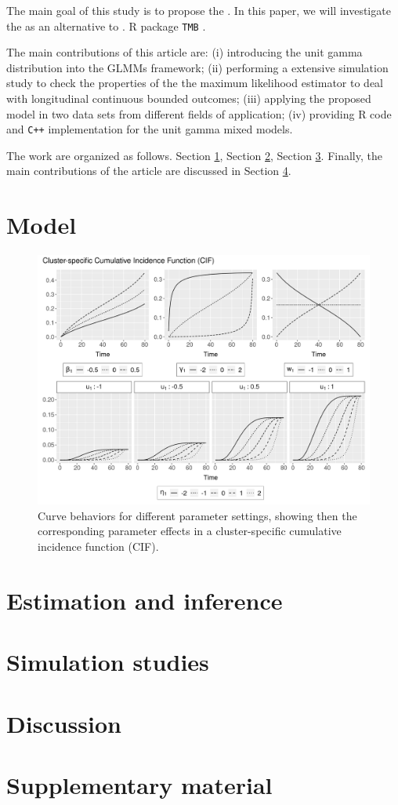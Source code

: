 \documentclass[a4paper,12pt]{article}
\begin{document}
The main goal of this study is to propose the . In this paper, we will
investigate the as an alternative to . R \citep{R21} package
\texttt{TMB} \citep{TMb}.

The main contributions of this article are: (i) introducing the unit
gamma distribution into the GLMMs framework; (ii) performing a extensive
simulation study to check the properties of the the maximum likelihood
estimator to deal with longitudinal continuous bounded outcomes; (iii)
applying the proposed model in two data sets from different fields of
application; (iv) providing R code and \texttt{C++} implementation for
the unit gamma mixed models.

The work are organized as follows. Section \ref{model}, Section
\ref{inference}, Section \ref{simulation}. Finally, the main
contributions of the article are discussed in Section \ref{discussion}.

\section{Model}
\label{model}

\begin{figure}[H]
 \centering \includegraphics[width=\linewidth]{pics/cifstudy-1.png}
 \vspace{-0.75cm}
 \caption{Curve behaviors for different parameter settings, showing then
   the corresponding parameter effects in a cluster-specific cumulative
   incidence function (CIF).}
 \label{fig:cifcoefs}
\end{figure}

\section{Estimation and inference}
\label{inference}

\section{Simulation studies}
\label{simulation}

\section{Discussion}
\label{discussion}

\section*{Supplementary material}



\end{document}
